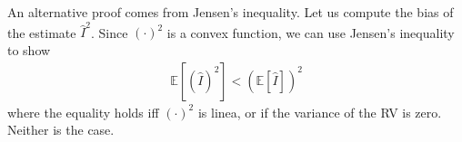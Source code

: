 \begin{enumerate}[label=\alph*.]
An alternative proof comes from Jensen's inequality. Let us compute the bias of the estimate $\hat{I}^2$. Since $(\cdot)^2$ is a convex function, we can use Jensen's inequality to show
\begin{align}
\mathbb{E}\left[(\hat{I})^2\right] < \left(\mathbb{E}\left[\hat{I}\right]\right)^2
\end{align}
where the equality holds iff $(\cdot)^2$ is linea, or if the variance of the RV is zero. Neither is the case.
\end{enumerate}
